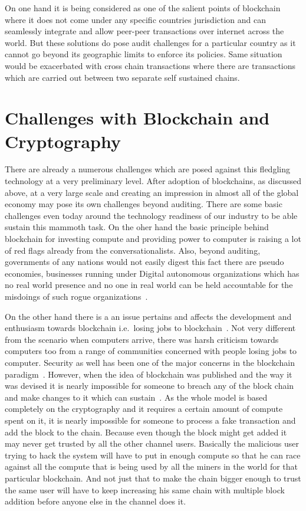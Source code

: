 On one hand it is being considered as one of the salient points of
blockchain where it does not come under any specific countries
jurisdiction and can seamlessly integrate and allow peer-peer
transactions over internet across the world. But these solutions do
pose audit challenges for a particular country as it cannot go beyond
its geographic limits to enforce its policies. Same situation would be
exacerbated with cross chain transactions where there are transactions
which are carried out between two separate self sustained chains.

\section{Challenges with Blockchain and Cryptography}

There are already a numerous challenges which are posed against this
fledgling technology at a very preliminary level. After adoption of
blockchains, as discussed above, at a very large scale and creating an
impression in almost all of the global economy may pose its own
challenges beyond auditing. There are some basic challenges even today
around the technology readiness of our industry to be able sustain
this mammoth task. On the oher hand the basic principle behind
blockchain for investing compute and providing power to computer is
raising a lot of red flags already from the conversationalists. Also,
beyond auditing, governments of any nations would not easily digest
this fact there are pseudo economies, businesses running under Digital
autonomous organizations which has no real world presence and no one
in real world can be held accountable for the misdoings of such rogue
organizations~\cite{myungsan33}.

On the other hand there is a an issue pertains and affects the
development and enthusiasm towards blockchain i.e.\ losing jobs to
blockchain~\cite{michael34}. Not very different from the scenario when
computers arrive, there was harsh criticism towards computers too from
a range of communities concerned with people losing jobs to computer.
Security as well has been one of the major concerns in the blockchain
paradigm~\cite{mauro35}. However, when the idea of blockchain was
published and the way it was devised it is nearly impossible for
someone to breach any of the block chain and make changes to it which
can sustain~\cite{bitcoin12}. As the whole model is based completely
on the cryptography and it requires a certain amount of compute spent
on it, it is nearly impossible for someone to process a fake
transaction and add the block to the chain. Because even though the
block might get added it may never get trusted by all the other
channel users. Basically the malicious user trying to hack the system
will have to put in enough compute so that he can race against all the
compute that is being used by all the miners in the world for that
particular blockchain. And not just that to make the chain bigger
enough to trust the same user will have to keep increasing his same
chain with multiple block addition before anyone else in the channel
does it.


